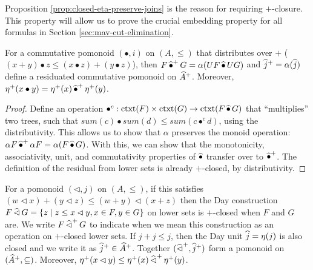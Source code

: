 \begin{remark}
  Proposition \ref{prop:closed-eta-preserve-joins} is the reason for
  requiring $+$-closure. This property will allow us to prove the
  crucial embedding property for all formulas in Section
  \ref{sec:mav-cut-elimination}.
\end{remark}

\begin{proposition}\label{prop:closed-monoid-distrib}
  For a commutative pomonoid $(\bullet, i)$ on $(A, \leq)$ that
  distributes over $+$
  ($(x + y) \bullet z \leq (x \bullet z) + (y \bullet z)$), then
  $F \mathop{\widehat{\bullet}^+} G = \alpha(U F \mathop{\widehat{\bullet}} U G)$ and
  $\mathop{\widehat{j}^+} = \alpha(\mathop{\widehat{j}})$ define a residuated commutative
  pomonoid on $\widehat{A}^+$. Moreover,
  $\eta^+(x \bullet y) = \eta^+(x) \mathop{\widehat{\bullet}^+} \eta^+(y)$.
\end{proposition}

\begin{proof}
  Define an operation
  $\bullet^c : \mathrm{ctxt}(F) \times \mathrm{ctxt}(G) \to
  \mathrm{ctxt}(F \mathop{\widehat{\bullet}} G)$ that ``multiplies'' two trees,
  such that
  $\mathit{sum}(c) \bullet \mathit{sum}(d) \leq \mathit{sum}(c
  \bullet^c d)$, using the distributivity. This allows us to show that
  $\alpha$ preserves the monoid operation:
  $\alpha F \mathop{\widehat{\bullet}^+} \alpha F = \alpha (F \mathop{\widehat{\bullet}}
  G)$. With this, we can show that the monotonicity, associativity,
  unit, and commutativity properties of $\mathop{\widehat{\bullet}}$ transfer over
  to $\mathop{\widehat{\bullet}^+}$. The definition of the residual from lower
  sets is already $+$-closed, by distributivity.
\end{proof}

\begin{proposition}\label{prop:closed-monoid-duoidal}
  For a pomonoid $(\lhd, j)$ on $(A, \leq)$, if this satisfies
  $(w \lhd x) + (y \lhd z) \leq (w + y) \lhd (x + z)$ then the Day
  construction
  $F \mathop{\widehat{\lhd}} G = \{ z \mid z \leq x \lhd y, x \in F, y \in G \}$ on
  lower sets is $+$-closed when $F$ and $G$ are. We write
  $F \mathop{\widehat{\lhd}^+} G$ to indicate when we mean this construction as
  an operation on $+$-closed lower sets. If $j + j \leq j$, then the
  Day unit $\mathop{\widehat{j}} = \eta(j)$ is also closed and we write it as
  $\mathop{\widehat{j}^+} \in \widehat{A}^+$. Together
  $(\mathop{\widehat{\lhd}^+}, \mathop{\widehat{j}^+})$ form a pomonoid on
  $(\widehat{A}^+, \subseteq)$. Moreover,
  $\eta^+(x \lhd y) \leq \eta^+(x) \mathop{\widehat{\lhd}^+} \eta^+(y)$.
\end{proposition}

